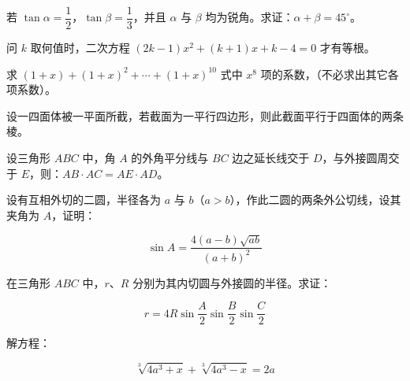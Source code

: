

\begin{question}
若 $\tan\alpha=\dfrac12$，$\tan\beta=\dfrac13$，并且 $\alpha$ 与 $\beta$ 均为锐角。求证：$\alpha+\beta=45^\circ$。

\end{question}
\begin{question}
问 $k$ 取何值时，二次方程 $(2k-1)x^2+(k+1)x+k-4=0$ 才有等根。

\end{question}
\begin{question}
求 $(1+x)+(1+x)^2+\cdots+(1+x)^{10}$ 式中 $x^8$ 项的系数，（不必求出其它各项系数）。

\Needspace{0.4\textheight}
\end{question}
\begin{question}
设一四面体被一平面所截，若截面为一平行四边形，则此截面平行于四面体的两条棱。
\nopagebreak[4]
\begin{center}\end{center}
\nopagebreak[4]
\end{question}
\begin{question}
设三角形 $ABC$ 中，角 $A$ 的外角平分线与 $BC$ 边之延长线交于 $D$，与外接圆周交于 $E$，则：$AB\cdot AC=AE\cdot AD$。

\end{question}
\begin{question}
设有互相外切的二圆，半径各为 $a$ 与 $b$（$a>b$），作此二圆的两条外公切线，设其夹角为 $A$，证明：

\nopagebreak[4]
\[
\sin A=\frac{4(a-b)\sqrt{ab}}{(a+b)^2}
\]

\end{question}
\begin{question}
在三角形 $ABC$ 中，$r$、$R$ 分别为其内切圆与外接圆的半径。求证：

\nopagebreak[4]
\[
r=4R\sin\frac A2\sin\frac B2\sin\frac C2
\]

\end{question}
\begin{question}
解方程：

\nopagebreak[4]
\[
\sqrt[3]{4a^3+x}+\sqrt[3]{4a^3-x}=2a
\]

\end{question}